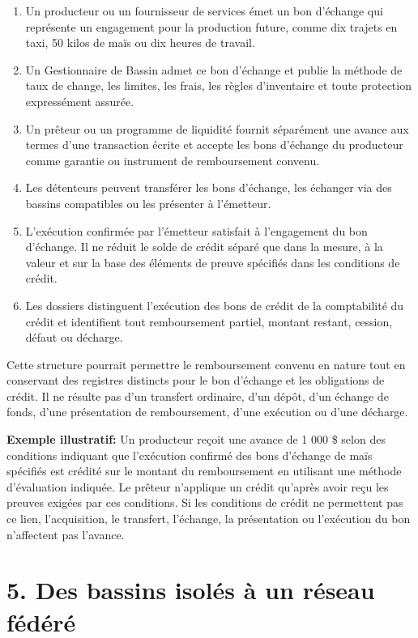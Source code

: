 \documentclass[11pt]{article}
\begin{document}
\begin{enumerate}[leftmargin=*]
\item Un producteur ou un fournisseur de services émet un bon d'échange qui représente un engagement pour la production future, comme dix trajets en taxi, 50 kilos de maïs ou dix heures de travail.
\item Un Gestionnaire de Bassin admet ce bon d'échange et publie la méthode de taux de change, les limites, les frais, les règles d'inventaire et toute protection expressément assurée.
\item Un prêteur ou un programme de liquidité fournit séparément une avance aux termes d'une transaction écrite et accepte les bons d'échange du producteur comme garantie ou instrument de remboursement convenu.
\item Les détenteurs peuvent transférer les bons d'échange, les échanger via des bassins compatibles ou les présenter à l'émetteur.
\item L'exécution confirmée par l'émetteur satisfait à l'engagement du bon d'échange. Il ne réduit le solde de crédit séparé que dans la mesure, à la valeur et sur la base des éléments de preuve spécifiés dans les conditions de crédit.
\item Les dossiers distinguent l'exécution des bons de crédit de la comptabilité du crédit et identifient tout remboursement partiel, montant restant, cession, défaut ou décharge.
\end{enumerate}
Cette structure pourrait permettre le remboursement convenu en nature tout en conservant des registres distincts pour le bon d'échange et les obligations de crédit. Il ne résulte pas d'un transfert ordinaire, d'un dépôt, d'un échange de fonds, d'une présentation de remboursement, d'une exécution ou d'une décharge.

\textbf{Exemple illustratif:} Un producteur reçoit une avance de 1 000 \$ selon des conditions indiquant que l'exécution confirmé des bons d'échange de maïs spécifiés est crédité sur le montant du remboursement en utilisant une méthode d'évaluation indiquée. Le prêteur n'applique un crédit qu'après avoir reçu les preuves exigées par ces conditions. Si les conditions de crédit ne permettent pas ce lien, l'acquisition, le transfert, l'échange, la présentation ou l'exécution du bon n'affectent pas l'avance.


\section*{5. Des bassins isolés à un réseau fédéré}
\end{document}
